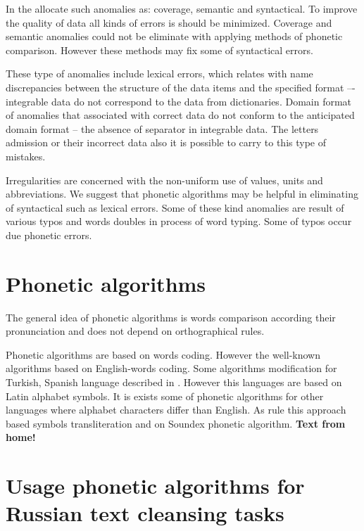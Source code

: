 \documentclass[conference,a4paper]{IEEEtran}
\begin{document}
In the \cite{Osipov-2002} allocate such anomalies as: coverage, semantic and syntactical. To improve the quality of data all kinds of errors is should be minimized. Coverage and semantic anomalies could not be eliminate with applying methods of phonetic comparison. However these methods may fix some of syntactical errors.   

These type of anomalies include lexical errors, which relates with name discrepancies between the structure of the data items and the specified format –- integrable data do not correspond to the data from dictionaries.  Domain format of anomalies that associated with correct data do not conform to the anticipated domain format – the absence of separator in integrable data. The letters admission or their incorrect data also it is possible to carry to this type of mistakes.

Irregularities are concerned with the non-uniform use of values, units and abbreviations.
We suggest that phonetic algorithms may be helpful in eliminating of syntactical such as lexical errors. Some of these kind anomalies are result of various typos and words doubles in process of word typing. Some of typos occur due phonetic errors. 

\section{Phonetic algorithms}
The general idea of phonetic algorithms is words comparison according their pronunciation and does not depend on orthographical rules.

Phonetic algorithms are based on words coding. However the well-known algorithms based on English-words coding. Some algorithms modification for Turkish, Spanish language described in \cite{Alotaibi-2013}. However this languages are based on Latin alphabet symbols. It is exists some of phonetic algorithms for other languages where alphabet characters differ than English. As rule this approach based symbols transliteration and on Soundex phonetic algorithm.
\textbf{Text from home!}

\section{Usage phonetic algorithms for Russian text cleansing tasks}
\end{document}
